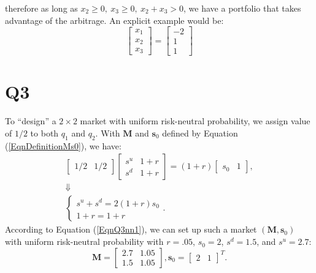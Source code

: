 \documentclass[final,3p,times]{elsarticle}
\begin{document}
	therefore as long as $x_2\geq0, ~x_3\geq0, ~x_2+x_3>0$, we have a portfolio that takes advantage of the arbitrage. An explicit example would be:
	\begin{equation}
		\begin{bmatrix} x_1 \\ x_2 \\ x_3 \end{bmatrix}=
		\begin{bmatrix} -2 \\ 1 \\ 1 \end{bmatrix}
	\end{equation}
	
\section{Q3}
	To ``design'' a $2\times2$ market with uniform risk-neutral probability, we assign value of $1/2$ to both $q_1$ and $q_2$. With $\mathbf{M}$ and $\mathbf{s}_0$ defined by Equation (\ref{EqnDefinitionMs0}), we have:
	\begin{gather}
		\begin{bmatrix} 1/2 & 1/2 \end{bmatrix}
		\begin{bmatrix} s^u & 1+r \\ s^d & 1+r \end{bmatrix}
		=
		\left( 1+r \right)\begin{bmatrix} s_0 & 1 \end{bmatrix},\\
		\Downarrow\nonumber\\
		\label{EqnQ3nn1}
		\begin{cases}
			s^u + s^d = 2\left(1+r\right) s_0 \\
			1+r = 1+r
		\end{cases}.
	\end{gather}
	According to Equation (\ref{EqnQ3nn1}), we can set up such a market $\left(\mathbf{M},\mathbf{s}_0\right)$ with uniform risk-neutral probability with $r=.05$, $s_0=2$, $s^d=1.5$, and $s^u=2.7$:
	\begin{subequations}
		\label{EqnQ3soln}
		\begin{equation}
		\mathbf{M}=
		\begin{bmatrix}
		2.7 & 1.05 \\
		1.5 & 1.05
		\end{bmatrix}
		,
		\end{equation}
		\begin{equation}
		\mathbf{s}_0=
		\begin{bmatrix}
		2 & 1
		\end{bmatrix}^T
		.
		\end{equation}
	\end{subequations}
	
\end{document}
